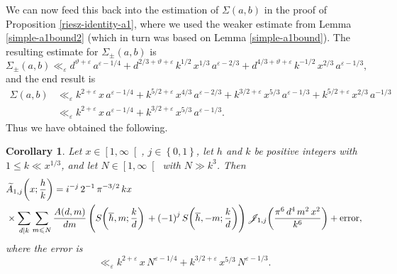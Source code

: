 \documentclass[a4paper,10pt,twoside]{amsart}
\newtheorem{corollary}[theorem]{Corollary}
\theoremstyle{definition}
\numberwithin{equation}{section}
\newcommand\eps{\varepsilon}
\renewcommand\:{\colon}
\begin{document}
\noindent We can now feed this back into the estimation of $\Sigma(a,b)$ in the proof of Proposition \ref{riesz-identity-a1}, where we used the weaker estimate from Lemma \ref{simple-a1bound2} (which in turn was based on Lemma \ref{simple-a1bound}). The resulting estimate for $\Sigma_\pm(a,b)$ is
\[\Sigma_\pm(a,b)\ll_\eps d^{\vartheta+\varepsilon}\,a^{\varepsilon-1/4}+d^{2/3+\vartheta+\varepsilon}\,k^{1/2}\,x^{1/3}\,a^{\varepsilon-2/3}+d^{4/3+\vartheta+\varepsilon}\,k^{-1/2}\,x^{2/3}\,a^{\varepsilon-1/3},\]
and the end result is
\begin{align*}
\Sigma(a,b)&\ll_\eps k^{2+\varepsilon}\,x\,a^{\varepsilon-1/4}+k^{5/2+\varepsilon}\,x^{4/3}\,a^{\varepsilon-2/3}+k^{3/2+\varepsilon}\,x^{5/3}\,a^{\varepsilon-1/3}+k^{5/2+\varepsilon}\,x^{2/3}\,a^{-1/3}\\
&\ll_\eps
 k^{2+\varepsilon}\,x\,a^{\varepsilon-1/4}
 +k^{3/2+\varepsilon}\,x^{5/3}\,a^{\varepsilon-1/3}.
\end{align*}
Thus we have obtained the following. 

\begin{corollary}\label{improved-A_1-voronoi}
Let $x\in\left[1,\infty\right[$, $j\in\left\{0,1\right\}$, let $h$ and $k$ be positive integers with $1\leqslant k\ll x^{1/3}$, and let $N\in\left[1,\infty\right[$ with $N\gg k^3$. Then
\begin{align*}
&\widetilde A_{1,j}\!\left(x;\frac hk\right)
=i^{-j}\,2^{-1}\,\pi^{-3/2}\,kx\\&\times\sum_{d\mid k}\sum_{m\leqslant N}\frac{A(d,m)}{dm}\left(S\!\left(\overline h,m;\frac kd\right)\vphantom{\Bigg|}+\left(-1\right)^jS\!\left(\overline h,-m;\frac kd\right)\right)\mathscr J_{1,j}\!\left(\frac{\pi^6\,d^4\,m^2\,x^2}{k^6}\right)+\text{error},
\end{align*}
where the error is
\[\ll_\eps k^{2+\varepsilon}\,x\,N^{\varepsilon-1/4}
 +k^{3/2+\varepsilon}\,x^{5/3}\,N^{\varepsilon-1/3}.
\]
\end{corollary}
\end{document}
